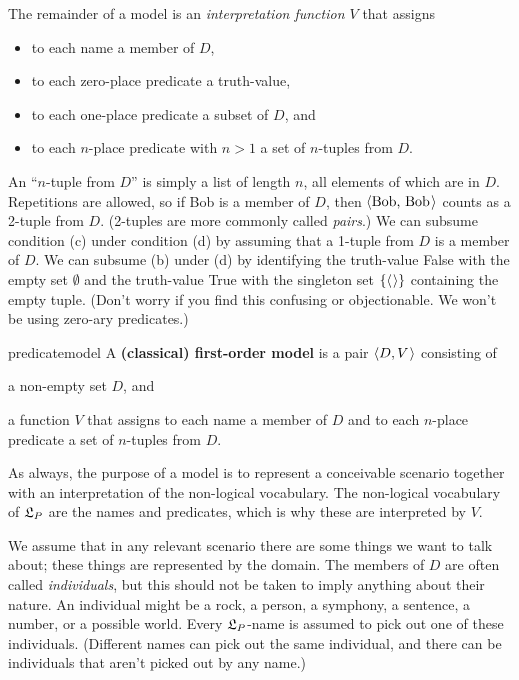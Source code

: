 The remainder of a model is an \emph{interpretation function $V$} that assigns
\begin{itemize}[leftmargin=10mm]
  \itemsep-1mm
  \item[(a)] to each name a member of $D$,
  \item[(b)] to each zero-place predicate a truth-value,
  \item[(c)] to each one-place predicate a subset of $D$, and
  \item[(d)] to each $n$-place predicate with $n>1$ a set of $n$-tuples from
        $D$.
\end{itemize}
An ``$n$-tuple from $D$'' is simply a list of length $n$, all elements of which
are in $D$. Repetitions are allowed, so if Bob is a member of $D$, then
$\t{\text{Bob, Bob}}$ counts as a 2-tuple from $D$. (2-tuples are more commonly
called \emph{pairs}.) We can subsume condition (c) under condition (d) by
assuming that a 1-tuple from $D$ is a member of $D$. We can subsume (b) under
(d) by identifying the truth-value False with the empty set $\emptyset$ and the
truth-value True with the singleton set $\{ \t{} \}$ containing the empty tuple.
(Don't worry if you find this confusing or objectionable. We won't be using
zero-ary predicates.)


\begin{definition}{}{predicatemodel}
  A \textbf{(classical) first-order model} is a pair $\t{D,V}$ consisting of
  \vspace{-3mm}
  \begin{itemize*}
    \item a non-empty set $D$, and
    \item a function $V$ that assigns to each name a member of $D$ and to each
    $n$-place predicate a set of $n$-tuples from $D$.
  \end{itemize*}
\end{definition}

As always, the purpose of a model is to represent a conceivable scenario together
with an interpretation of the non-logical vocabulary. The non-logical vocabulary
of $\mathfrak{L}_P$ are the names and predicates, which is why these are interpreted by
$V$. 

We assume that in any relevant scenario there are some things we want to talk
about; these things are represented by the domain. The members of $D$ are often
called \emph{individuals}, but this should not be taken to imply anything about
their nature. An individual might be a rock, a person, a symphony, a sentence, a
number, or a possible world. Every $\mathfrak{L}_P$-name is assumed to pick out one of
these individuals. (Different names can pick out the same individual, and there
can be individuals that aren't picked out by any name.)


